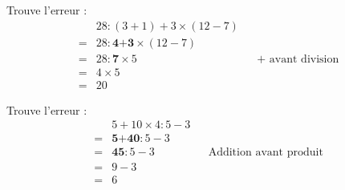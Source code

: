 \begin{multicols}{2}
  Trouve l'erreur :
  \begin{align*}
      &28:(3+1)+3\times (12-7)&&\\
      =&28:\textbf{4+3}\times (12-7)&&\\
      =&28:\textbf{7}\times 5&&\text{+ avant division}\\
      =&4\times 5&&\\
      =&20
  \end{align*}

  Trouve l'erreur :
  \begin{align*}
      &5+10\times 4:5-3&&\\
      =&\textbf{5+40}:5-3&&\\
      =&\textbf{45}:5-3&&\text{Addition avant produit}\\
      =&9-3&&\\
      =&6
  \end{align*}
\end{multicols}